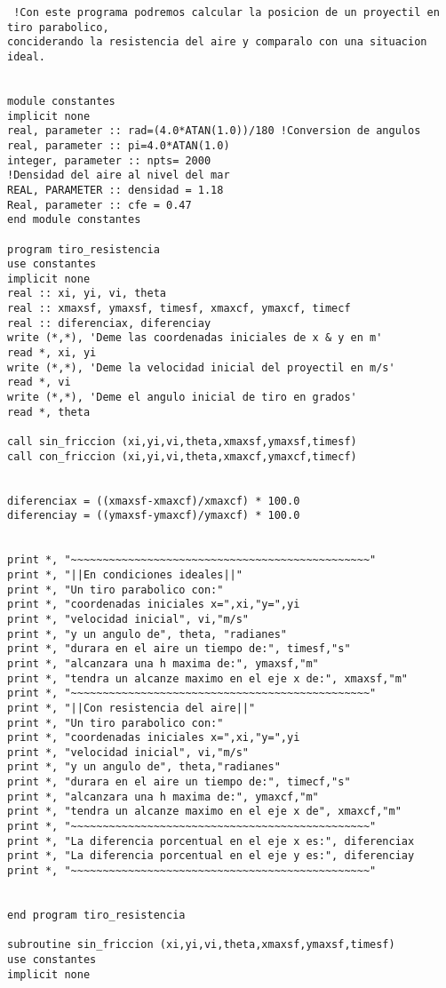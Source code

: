\documentclass[10pt]{article}
\begin{document}
\begin{verbatim}  
 !Con este programa podremos calcular la posicion de un proyectil en tiro parabolico, 
conciderando la resistencia del aire y comparalo con una situacion ideal.


module constantes
implicit none
real, parameter :: rad=(4.0*ATAN(1.0))/180 !Conversion de angulos
real, parameter :: pi=4.0*ATAN(1.0)
integer, parameter :: npts= 2000 
!Densidad del aire al nivel del mar
REAL, PARAMETER :: densidad = 1.18
Real, parameter :: cfe = 0.47
end module constantes

program tiro_resistencia
use constantes
implicit none 
real :: xi, yi, vi, theta
real :: xmaxsf, ymaxsf, timesf, xmaxcf, ymaxcf, timecf
real :: diferenciax, diferenciay
write (*,*), 'Deme las coordenadas iniciales de x & y en m'
read *, xi, yi
write (*,*), 'Deme la velocidad inicial del proyectil en m/s'
read *, vi
write (*,*), 'Deme el angulo inicial de tiro en grados'
read *, theta

call sin_friccion (xi,yi,vi,theta,xmaxsf,ymaxsf,timesf)
call con_friccion (xi,yi,vi,theta,xmaxcf,ymaxcf,timecf)


diferenciax = ((xmaxsf-xmaxcf)/xmaxcf) * 100.0
diferenciay = ((ymaxsf-ymaxcf)/ymaxcf) * 100.0


print *, "~~~~~~~~~~~~~~~~~~~~~~~~~~~~~~~~~~~~~~~~~~~~~~~"
print *, "||En condiciones ideales||"
print *, "Un tiro parabolico con:"
print *, "coordenadas iniciales x=",xi,"y=",yi
print *, "velocidad inicial", vi,"m/s"
print *, "y un angulo de", theta, "radianes"
print *, "durara en el aire un tiempo de:", timesf,"s"
print *, "alcanzara una h maxima de:", ymaxsf,"m"
print *, "tendra un alcanze maximo en el eje x de:", xmaxsf,"m"
print *, "~~~~~~~~~~~~~~~~~~~~~~~~~~~~~~~~~~~~~~~~~~~~~~~"
print *, "||Con resistencia del aire||"
print *, "Un tiro parabolico con:"
print *, "coordenadas iniciales x=",xi,"y=",yi
print *, "velocidad inicial", vi,"m/s"
print *, "y un angulo de", theta,"radianes"
print *, "durara en el aire un tiempo de:", timecf,"s"
print *, "alcanzara una h maxima de:", ymaxcf,"m"
print *, "tendra un alcanze maximo en el eje x de", xmaxcf,"m"
print *, "~~~~~~~~~~~~~~~~~~~~~~~~~~~~~~~~~~~~~~~~~~~~~~~"
print *, "La diferencia porcentual en el eje x es:", diferenciax
print *, "La diferencia porcentual en el eje y es:", diferenciay
print *, "~~~~~~~~~~~~~~~~~~~~~~~~~~~~~~~~~~~~~~~~~~~~~~~"


end program tiro_resistencia

subroutine sin_friccion (xi,yi,vi,theta,xmaxsf,ymaxsf,timesf)
use constantes
implicit none


\end{verbatim}
\end{document}
